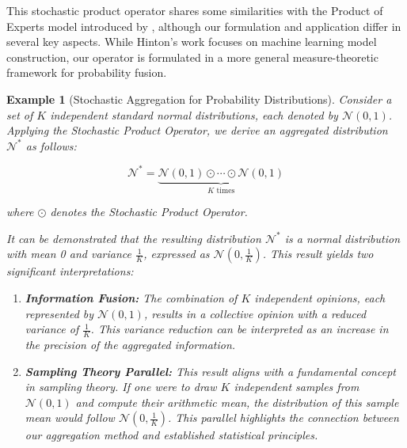 \documentclass[letterpaper]{article} %
\newtheorem{example}[theorem]{Example}
\theoremstyle{definition}
\theoremstyle{remark}
\begin{document}
This stochastic product operator shares some similarities with the Product of Experts model introduced by \citet{hinton2002training}, although our formulation and application differ in several key aspects. While Hinton's work focuses on machine learning model construction, our operator is formulated in a more general measure-theoretic framework for probability fusion. 

\begin{example}[Stochastic Aggregation for Probability Distributions]
Consider a set of $K$ independent standard normal distributions, each denoted by $\mathcal{N}(0, 1)$. Applying the Stochastic Product Operator, we derive an aggregated distribution $\mathcal{N}^*$ as follows:

\begin{equation}
\mathcal{N}^* = \underbrace{\mathcal{N}(0, 1) \odot  \cdots \odot \mathcal{N}(0, 1)}_{\text{$K$ times}}
\end{equation}

where $\odot$ denotes the Stochastic Product Operator. 

It can be demonstrated that the resulting distribution $\mathcal{N}^*$ is a normal distribution with mean 0 and variance $\frac{1}{K}$, expressed as $\mathcal{N}(0, \frac{1}{K})$. This result yields two significant interpretations:

\begin{enumerate}
    \item \textbf{Information Fusion:} The combination of $K$ independent opinions, each represented by $\mathcal{N}(0, 1)$, results in a collective opinion with a reduced variance of $\frac{1}{K}$. This variance reduction can be interpreted as an increase in the precision of the aggregated information.
    
    \item \textbf{Sampling Theory Parallel:} This result aligns with a fundamental concept in sampling theory. If one were to draw $K$ independent samples from $\mathcal{N}(0, 1)$ and compute their arithmetic mean, the distribution of this sample mean would follow $\mathcal{N}(0, \frac{1}{K})$. This parallel highlights the connection between our aggregation method and established statistical principles.
\end{enumerate}

\end{example}
\end{document}
